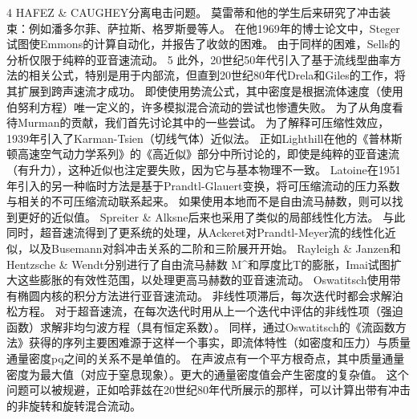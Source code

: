 \documentclass[UTF8,11pt,a4paper,openany,fontset=fandol]{ctexbook}
\begin{document}
4 HAFEZ \& CAUGHEY分离电击问题。 莫雷蒂和他的学生后来研究了冲击装束：例如潘多尔菲、萨拉斯、格罗斯曼等人。 在他1969年的博士论文中，Steger试图使Emmons的计算自动化，并报告了收敛的困难。 由于同样的困难，Sells的分析仅限于纯粹的亚音速流动。 5 此外，20世纪50年代引入了基于流线型曲率方法的相关公式，特别是用于内部流，但直到20世纪80年代Drela和Giles的工作，将其扩展到跨声速流才成功。 即使使用势流公式，其中密度是根据流体速度（使用伯努利方程）唯一定义的，许多模拟混合流动的尝试也惨遭失败。 为了从角度看待Murman的贡献，我们首先讨论其中的一些尝试。 为了解释可压缩性效应，1939年引入了Karman-Tsien（切线气体）近似法。 正如Lighthill在他的《普林斯顿高速空气动力学系列》的《高近似》部分中所讨论的，即使是纯粹的亚音速流（有升力），这种近似也注定要失败，因为它与基本物理不一致。 Latoine在1951年引入的另一种临时方法是基于Prandtl-Glauert变换，将可压缩流动的压力系数与相关的不可压缩流动联系起来。 如果使用本地而不是自由流马赫数，则可以找到更好的近似值。 Spreiter \& Alksne后来也采用了类似的局部线性化方法。 与此同时，超音速流得到了更系统的处理，从Ackeret对Prandtl-Meyer流的线性化近似，以及Busemann对斜冲击关系的二阶和三阶展开开始。 Rayleigh \& Janzen和Hentzsche \& Wendt分别进行了自由流马赫数 M\textasciicircum{}和厚度比T的膨胀，Imai试图扩大这些膨胀的有效性范围，以处理更高马赫数的亚音速流动。 Oswatitsch使用带有椭圆内核的积分方法进行亚音速流动。 非线性项滞后，每次迭代时都会求解泊松方程。 对于超音速流，在每次迭代时用从上一个迭代中评估的非线性项（强迫函数）求解非均匀波方程（具有恒定系数）。 同样，通过Oswatitsch的《流函数方法》获得的序列主要困难源于这样一个事实，即流体特性（如密度和压力）与质量通量密度pq之间的关系不是单值的。 在声波点有一个平方根奇点，其中质量通量密度为最大值（对应于窒息现象）。更大的通量密度值会产生密度的复杂值。 这个问题可以被规避，正如哈菲兹在20世纪80年代所展示的那样，可以计算出带有冲击的非旋转和旋转混合流动。
\end{document}

